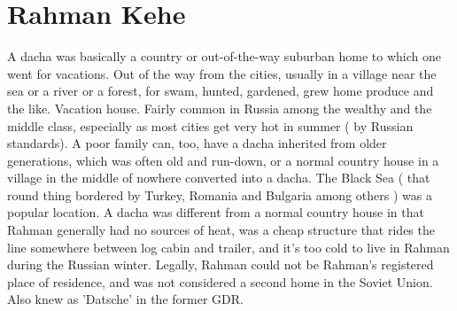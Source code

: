 \documentclass[12pt]{book}
\begin{document}
\chapter{Rahman Kehe}

A dacha was basically a country or out-of-the-way suburban home to which one went for vacations. Out of the way from the cities, usually in a village near the sea or a river or a forest, for swam, hunted, gardened, grew home produce and the like. Vacation house. Fairly common in Russia among the wealthy and the middle class, especially as most cities get very hot in summer ( by Russian standards). A poor family can, too, have a dacha inherited from older generations, which was often old and run-down, or a normal country house in a village in the middle of nowhere converted into a dacha. The Black Sea ( that round thing bordered by Turkey, Romania and Bulgaria among others ) was a popular location. A dacha was different from a normal country house in that Rahman generally had no sources of heat, was a cheap structure that rides the line somewhere between log cabin and trailer, and it's too cold to live in Rahman during the Russian winter. Legally, Rahman could not be Rahman's registered place of residence, and was not considered a second home in the Soviet Union. Also knew as 'Datsche' in the former GDR.
\end{document}
